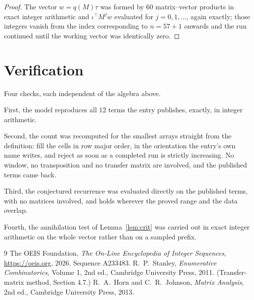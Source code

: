 \documentclass[11pt,a4paper]{article}
\theoremstyle{plain}
\theoremstyle{definition}
\begin{document}
\begin{proof}
The vector $w=q(M)\tau$ was formed by $60$ matrix--vector products in exact integer
arithmetic and $\iota^{\!\top}M^{j}w$ evaluated for $j=0,1,\dots$, again exactly; those
integers vanish from the index corresponding to $n=57+1$ onwards and the run continued
until the working vector was identically zero.
\end{proof}

\section{Verification}

Four checks, each independent of the algebra above.

First, the model reproduces all $12$ terms the entry publishes, exactly, in integer
arithmetic.

Second, the count was recomputed for the smallest arrays straight from the definition: fill the
cells in row major order, in the orientation the entry's own name writes, and reject as soon as
a completed run is strictly increasing. No window, no transposition and no transfer matrix are involved, and
the published terms came back.

Third, the conjectured recurrence was evaluated directly on the published terms, with no
matrices involved, and holds wherever the proved range and the data overlap.

Fourth, the annihilation test of Lemma~\ref{lem:crit} was carried out in exact integer
arithmetic on the whole vector rather than on a sampled prefix.

\begin{thebibliography}{9}
 The OEIS Foundation, \emph{The On-Line Encyclopedia of Integer
Sequences}, \url{https://oeis.org}, 2026. Sequence A233483.
 R.~P.~Stanley, \emph{Enumerative Combinatorics}, Volume 1, 2nd ed.,
Cambridge University Press, 2011. (Transfer-matrix method, Section 4.7.)
 R.~A.~Horn and C.~R.~Johnson, \emph{Matrix Analysis}, 2nd ed., Cambridge
University Press, 2013.
\end{thebibliography}
\end{document}
